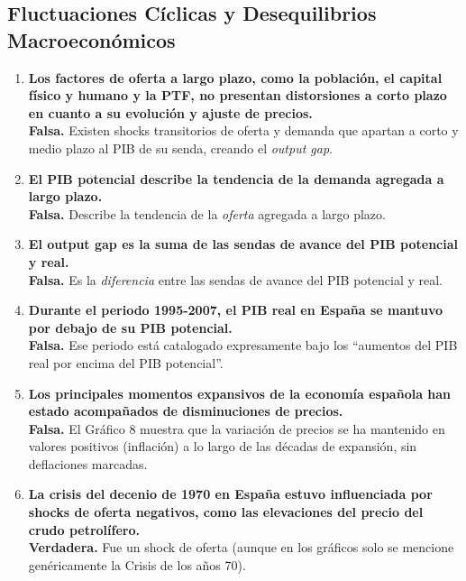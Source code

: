 \subsection*{Fluctuaciones Cíclicas y Desequilibrios Macroeconómicos}

\begin{enumerate}[label=\arabic*., resume=preguntas]

    \item \textbf{Los factores de oferta a largo plazo, como la población, el capital físico y humano y la PTF, no presentan distorsiones a corto plazo en cuanto a su evolución y ajuste de precios.} \\
    \textbf{Falsa.} Existen shocks transitorios de oferta y demanda que apartan a corto y medio plazo al PIB de su senda, creando el \textit{output gap}.

    \item \textbf{El PIB potencial describe la tendencia de la demanda agregada a largo plazo.} \\
    \textbf{Falsa.} Describe la tendencia de la \textit{oferta} agregada a largo plazo.

    \item \textbf{El output gap es la suma de las sendas de avance del PIB potencial y real.} \\
    \textbf{Falsa.} Es la \textit{diferencia} entre las sendas de avance del PIB potencial y real.

    \item \textbf{Durante el periodo 1995-2007, el PIB real en España se mantuvo por debajo de su PIB potencial.} \\
    \textbf{Falsa.} Ese periodo está catalogado expresamente bajo los ``aumentos del PIB real por encima del PIB potencial''.

    \item \textbf{Los principales momentos expansivos de la economía española han estado acompañados de disminuciones de precios.} \\
    \textbf{Falsa.} El Gráfico 8 muestra que la variación de precios se ha mantenido en valores positivos (inflación) a lo largo de las décadas de expansión, sin deflaciones marcadas.

    \item \textbf{La crisis del decenio de 1970 en España estuvo influenciada por shocks de oferta negativos, como las elevaciones del precio del crudo petrolífero.} \\
    \textbf{Verdadera.} Fue un shock de oferta (aunque en los gráficos solo se mencione genéricamente la Crisis de los años 70).


\end{enumerate}
